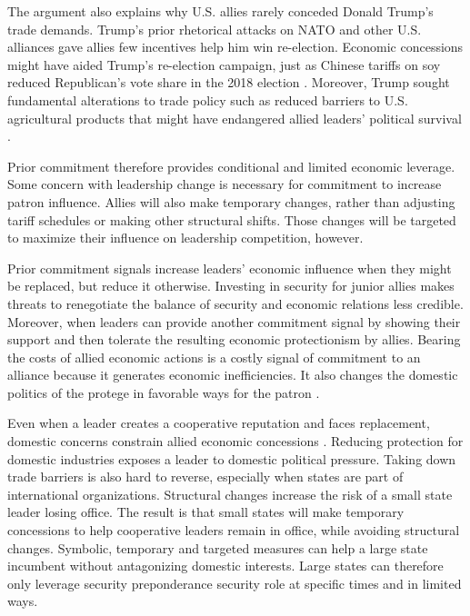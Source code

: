 \documentclass[12pt]{article}
\begin{document}
The argument also explains why U.S. allies rarely conceded Donald Trump's trade demands. 
Trump's prior rhetorical attacks on NATO and other U.S. alliances gave allies few incentives help him win re-election. 
Economic concessions might have aided Trump's re-election campaign, just as Chinese tariffs on soy reduced Republican's vote share in the 2018 election \citep{ChyzhUrbatsch2021}. 
Moreover, Trump sought fundamental alterations to trade policy such as reduced barriers to U.S. agricultural products that might have endangered allied leaders' political survival \citep{HeeParkJensen2007}.


Prior commitment therefore provides conditional and limited economic leverage. 
Some concern with leadership change is necessary for commitment to increase patron influence. 
Allies will also make temporary changes, rather than adjusting tariff schedules or making other structural shifts. 
Those changes will be targeted to maximize their influence on leadership competition, however. 


Prior commitment signals increase leaders' economic influence when they might be replaced, but reduce it otherwise. 
Investing in security for junior allies makes threats to renegotiate the balance of security and economic relations less credible. 
Moreover, when leaders can provide another commitment signal by showing their support and then tolerate the resulting economic protectionism by allies. 
Bearing the costs of allied economic actions is a costly signal of commitment to an alliance because it generates economic inefficiencies. 
It also changes the domestic politics of the protege in favorable ways for the patron \citep{Lake2013}. 


Even when a leader creates a cooperative reputation and faces replacement, domestic concerns constrain allied economic concessions \citep{Davis2008}. 
Reducing protection for domestic industries exposes a leader to domestic political pressure. 
Taking down trade barriers is also hard to reverse, especially when states are part of international organizations.
Structural changes increase the risk of a small state leader losing office.  
The result is that small states will make temporary concessions to help cooperative leaders remain in office, while avoiding structural changes. 
Symbolic, temporary and targeted measures can help a large state incumbent without antagonizing domestic interests. 
Large states can therefore only leverage security preponderance security role at specific times and in limited ways.
\end{document}
